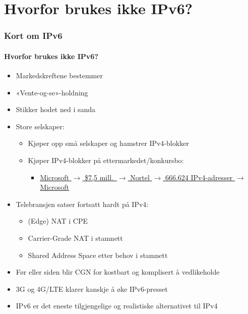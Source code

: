 \section{Hvorfor brukes ikke IPv6?}
\begin{frame}%
  \frametitle{Kort om IPv6}
  \framesubtitle{Hvorfor brukes ikke IPv6?}
  \pause
  \begin{itemize}[<+->]
  \item Markedskreftene bestemmer
  \item «Vente-og-se»-holdning
  \item Stikker hodet ned i sanda
  \item Store selskaper:
    \begin{itemize}[<+->]
    \item Kjøper opp små selskaper og hamstrer IPv4-blokker
    \item Kjøper IPv4-blokker på ettermarkedet/konkursbo:
      \begin{itemize}[<+->]
      \item
        \href{http://www.computerworld.com/s/article/9215055/Microsoft_offers_7.5M_for_666_624_IPv4_addresses}{Microsoft
          $\to$ \$7,5 mill.\ $\to$ Nortel $\to$ 666.624 IPv4-adresser
          $\to$ Microsoft}
      \end{itemize}
    \end{itemize}
  \item Telebransjen satser fortsatt hardt på IPv4:
    \begin{itemize}[<+->]
    \item (Edge) NAT i CPE\hfill{}
    \item Carrier-Grade NAT i stamnett\hfill{}
    \item Shared Address Space etter behov i stamnett\hfill{}
    \end{itemize}
  \item Før eller siden blir CGN for kostbart og komplisert å vedlikeholde
  \item 3G og 4G/LTE klarer kanskje å øke IPv6-presset\hfill{}
  \item \alert<16>{IPv6 er det eneste tilgjengelige og realistiske alternativet til IPv4}
  \end{itemize}
\end{frame}

